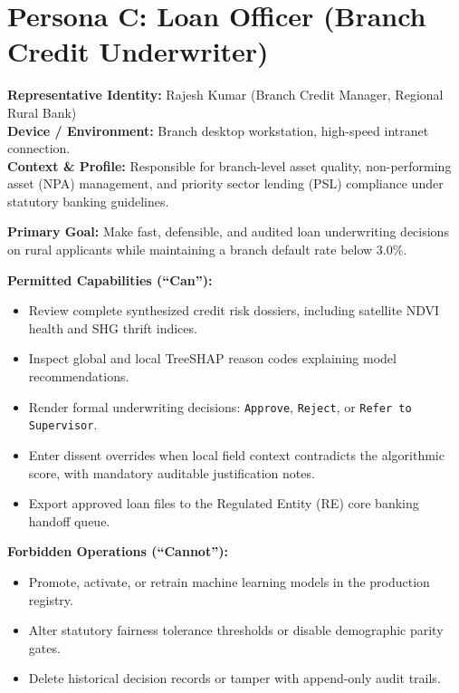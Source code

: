 \section{Persona C: Loan Officer (Branch Credit Underwriter)}
\noindent\textbf{Representative Identity:} Rajesh Kumar (Branch Credit Manager, Regional Rural Bank)\\
\textbf{Device / Environment:} Branch desktop workstation, high-speed intranet connection.\\
\textbf{Context \& Profile:} Responsible for branch-level asset quality, non-performing asset (NPA) management, and priority sector lending (PSL) compliance under statutory banking guidelines.

\vspace{0.2cm}
\noindent\textbf{Primary Goal:} Make fast, defensible, and audited loan underwriting decisions on rural applicants while maintaining a branch default rate below 3.0\%.

\vspace{0.2cm}
\noindent\textbf{Permitted Capabilities (``Can''):}
\begin{itemize}[leftmargin=1.5em, itemsep=1pt]
  \item Review complete synthesized credit risk dossiers, including satellite NDVI health and SHG thrift indices.
  \item Inspect global and local TreeSHAP reason codes explaining model recommendations.
  \item Render formal underwriting decisions: \texttt{Approve}, \texttt{Reject}, or \texttt{Refer to Supervisor}.
  \item Enter dissent overrides when local field context contradicts the algorithmic score, with mandatory auditable justification notes.
  \item Export approved loan files to the Regulated Entity (RE) core banking handoff queue.
\end{itemize}

\noindent\textbf{Forbidden Operations (``Cannot''):}
\begin{itemize}[leftmargin=1.5em, itemsep=1pt]
  \item Promote, activate, or retrain machine learning models in the production registry.
  \item Alter statutory fairness tolerance thresholds or disable demographic parity gates.
  \item Delete historical decision records or tamper with append-only audit trails.
\end{itemize}

